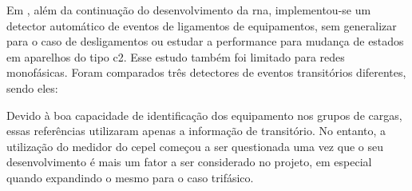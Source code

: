 Em \cite{nilm_cepel_alvaro}, além da continuação do desenvolvimento da
\gls{rna}, implementou-se um detector automático de eventos de
ligamentos de equipamentos, sem generalizar para o caso de
desligamentos ou estudar a performance para mudança de estados em
aparelhos do tipo \gls{c2}. Esse estudo também foi limitado para
redes monofásicas. Foram comparados três detectores de eventos
transitórios diferentes, sendo eles:


Devido à boa capacidade de identificação dos equipamento nos grupos de
cargas, essas referências utilizaram apenas a informação de
transitório. No entanto, a utilização do medidor do \gls{cepel}
começou a ser questionada uma vez que o seu desenvolvimento é mais um
fator a ser considerado no projeto, em especial quando expandindo o
mesmo para o caso trifásico.



